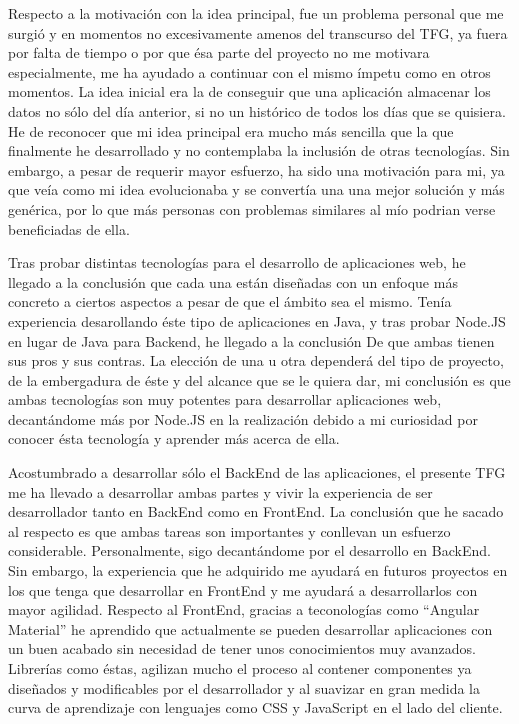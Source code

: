 \documentclass[11pt,openany]{book}
\begin{document}
Respecto a la motivación con la idea principal, fue un problema personal que me surgió y en momentos no excesivamente amenos del transcurso del TFG, ya fuera por falta de tiempo o por que ésa parte del proyecto no me motivara especialmente, me ha ayudado a continuar con el mismo ímpetu como en otros momentos. La idea inicial era la de conseguir que una aplicación almacenar los datos no sólo del día anterior, si no un histórico de todos los días que se quisiera. He de reconocer que mi idea principal era mucho más sencilla que la que finalmente he desarrollado y no contemplaba la inclusión de otras tecnologías. Sin embargo, a pesar de requerir mayor esfuerzo, ha sido una motivación para mi, ya que veía como mi idea evolucionaba y se convertía una una mejor solución y más genérica, por lo que más personas con problemas similares al mío podrian verse beneficiadas de ella.

Tras probar distintas tecnologías para el desarrollo de aplicaciones web, he llegado a la conclusión que cada una están diseñadas con un enfoque más concreto a ciertos aspectos a pesar de que el ámbito sea el mismo. Tenía experiencia desarollando éste tipo de aplicaciones en Java, y tras probar Node.JS en lugar de Java para Backend, he llegado a la conclusión De que ambas tienen sus pros y sus contras. La elección de una u otra dependerá del tipo de proyecto, de la embergadura de éste y del alcance que se le quiera dar, mi conclusión es que ambas tecnologías son muy potentes para desarrollar aplicaciones web, decantándome más por Node.JS en la realización debido a mi curiosidad por conocer ésta tecnología y aprender más acerca de ella.

Acostumbrado a desarrollar sólo el BackEnd de las aplicaciones, el presente TFG me ha llevado a desarrollar ambas partes y vivir la experiencia de ser desarrollador tanto en BackEnd como en FrontEnd. La conclusión que he sacado al respecto es que ambas tareas son importantes y conllevan un esfuerzo considerable. Personalmente, sigo decantándome por el desarrollo en BackEnd. Sin embargo, la experiencia que he adquirido me ayudará en futuros proyectos en los que tenga que desarrollar en FrontEnd y me ayudará a desarrollarlos con mayor agilidad. Respecto al FrontEnd, gracias a teconologías como ``Angular Material'' he aprendido que actualmente se pueden desarrollar aplicaciones con un buen acabado sin necesidad de tener unos conocimientos muy avanzados. Librerías como éstas, agilizan mucho el proceso al contener componentes ya diseñados y modificables por el desarrollador y al suavizar en gran medida la curva de aprendizaje con lenguajes como CSS y JavaScript en el lado del cliente.
\end{document}
